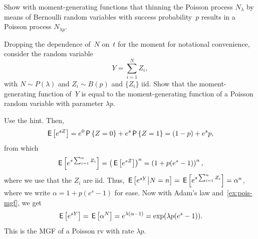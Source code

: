\documentclass[queueing-book.tex]{subfiles}
\begin{document}
\begin{exercise}\label{ex:1}
 Show with moment-generating functions that thinning the Poisson process $N_\lambda$ by means of Bernoulli random variables with success probability~$p$ results in a Poisson process $N_{\lambda p}$.
\begin{hint}
Dropping the dependence of~$N$ on~$t$ for the moment for notational convenience, consider the random variable
 \begin{equation*}
 Y = \sum_{i=1}^N Z_i,
 \end{equation*}
 with $N\sim P(\lambda)$ and $Z_i\sim B(p)$ and $\{Z_{i}\}$ iid.
Show that the moment-generating function of~$Y$ is equal to the moment-generating function of a Poisson random variable with parameter $\lambda p$.
\end{hint}
\begin{solution}

Use the hint. Then,
\begin{equation*}
 \,\mathsf{E}\left[e^{s Z}\right] = e^0 \,\mathsf{P}\left\{Z=0\right\} + e^{s} \,\mathsf{P}\left\{Z=1\right\} = (1-p) + e^s p,
\end{equation*}
from which
\begin{equation*}
\,\mathsf{E}\left[e^{s\sum_{i=1}^n Z_i}\right] = \left(\,\mathsf{E}\left[e^{s Z}\right]\right)^n = \left(1 + p (e^s - 1)\right)^n,
\end{equation*}
where we use that the $Z_i$  are iid.
Thus, $\,\mathsf{E}\left[e^{sY}\big|N=n\right] = \,\mathsf{E}\left[e^{s\sum_{i=1}^n Z_i}\right] = \alpha^{n}$, where we write $\alpha =1 + p (e^s - 1)$ for ease.
Now with Adam's law and~\cref{ex:pois-mgf}, we get
\begin{equation*}
\,\mathsf{E}\left[e^{sY}\right] = \,\mathsf{E}\left[\alpha^{N}\right] = e^{\lambda (\alpha - 1)} = \exp(\lambda p (e^s - 1)).
\end{equation*}
This is the MGF of a Poisson rv with rate $\lambda p$.
\end{solution}
\end{exercise}

\end{document}
